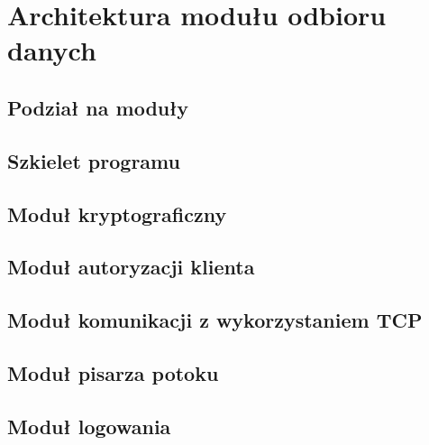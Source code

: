 \chapter{Architektura modułu odbioru danych}

\section[Podział na moduły][Podział na moduły]{Podział na moduły}

\section[Szkielet programu][Szkielet programu]{Szkielet programu}

\section[Moduł kryptograficzny][Moduł kryptograficzny]{Moduł kryptograficzny}

\section[Moduł autoryzacyjny][Moduł autoryzacji klienta]{Moduł autoryzacji klienta}

\section[Moduł TCP][Moduł komunikacji z wykorzystaniem TCP]{Moduł komunikacji z wykorzystaniem TCP}

\section[Moduł pisarza potoku][Moduł pisarza potoku]{Moduł pisarza potoku}

\section[Moduł logowania][Moduł logowania]{Moduł logowania}
